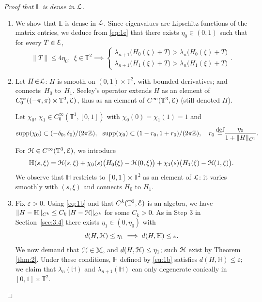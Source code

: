 \documentclass[11pt]{article}
\newcommand{\skpt}{\smallskip}
\numberwithin{equation}{section}
\let\pazocal\EuScript
\theoremstyle{definition}
\newcommand{\supp}{\mathrm{supp}}
\newcommand{\EE}{\pazocal{E}}
\newcommand{\LL}{{\pazocal{L}}}
\newcommand{\HH}{\pazocal{H}}
\newcommand{\Hh}{{\mathbb{H}}}
\newcommand{\Ll}{\mathbb{L}}
\newcommand{\Mm}{\mathbb{M}}
\newcommand{\Z}{\mathbb{Z}}
\newcommand{\Tt}{{\mathbb{T}}}
\let\epsi\varepsilon
\newcommand{\systeme}[1]{\left\{ \begin{matrix} #1 \end{matrix}\right.}
\newcommand{\de}{\,\mathrel{\stackrel{\makebox[0pt]{\mbox{\normalfont\tiny def}}}{=}}}
\begin{document}
\skpt
\begin{proof}[Proof that $\Ll$ is dense in $\LL$]
\begin{enumerate}
\item
We show that $\Ll$ is dense in $\LL$.
Since eigenvalues are Lipschitz functions of the matrix entries, we deduce from \eqref{eq:1e} that there exists $\eta_0 \in (0,1)$ such that for every $T \in \EE$,
\begin{equation}\label{eq:2a}
\| T \| \leq 4\eta_0, \ \ \xi \in \Tt^2 \implies \systeme{
\lambda_{n+1}\bigl(H_0(\xi)+T\bigr) > \lambda_n\bigl(H_0(\xi)+T\bigr)
\\[5pt]
\lambda_{n+1}\bigl(H_1(\xi)+T\bigr) > \lambda_n\bigl(H_1(\xi)+T\bigr)}.
\end{equation}

\item
Let $H\!\in\!\LL$: $H$ is smooth on $(0,1)\!\times\!\Tt^2$, with bounded derivatives; and connects~$H_0$ to~$H_1$. Seeley's operator \cite{S65} extends $H$ as an element of \hbox{$C_0^\infty((-\pi,\pi) \times \Tt^2,\EE)$}, thus as an element of $C^\infty(\Tt^3,\EE)$ (still denoted $H$).

Let $\chi_0$, $\chi_1 \in C_0^\infty(\Tt^1,[0,1])$ with $\chi_0(0) = \chi_1(1) = 1$ and
\begin{equation*}
\supp(\chi_0) \subset (-\delta_0,\delta_0)/(2\pi \Z), \ \ \supp(\chi_0) \subset (1-r_0,1+r_0)/(2\pi \Z), \quad r_0 \de \dfrac{\eta_0}{1+\| H \|_{C^1}}.
\end{equation*}
For $\HH \in C^\infty(\Tt^3,\EE)$, we introduce
\begin{equation}\label{eq:1b}
\Hh(s,\xi) = \HH(s,\xi) + \chi_0(s) \bigl( H_0(\xi) - \HH(0,\xi) \bigr) + \chi_1(s) \bigl( H_1(\xi) - \HH(1,\xi) \bigr).
\end{equation}
We observe that $\Hh$ restricts to $[0,1] \times \Tt^2$ as an element of $\LL$: it varies smoothly with $(s,\xi)$ and connects $H_0$ to $H_1$.

\item
Fix $\epsi > 0$. Using \eqref{eq:1b} and that $C^k(\Tt^3,\EE)$ is an algebra, we have $\| H -\Hh \|_{C^k} \leq C_k \| H -\HH \|_{C^k}$ for some $C_k > 0$. As in Step 3 in Section~\ref{sec:3.4} there exists $\eta_1 \in (0,\eta_0)$ with
\begin{equation*}
d(H,\HH) \leq \eta_1 \implies d(H,\Hh) \leq \epsi.
\end{equation*}
We now demand that $\HH \in \Mm$, and $d(H,\HH) \leq \eta_1$; such $\HH$ exist by Theorem \ref{thm:2}. Under these conditions, $\Hh$ defined by \eqref{eq:1b} satisfies $d(H,\Hh) \leq \epsi$; we claim that $\lambda_n(\Hh)$ and $\lambda_{n+1}(\Hh)$ can only degenerate conically in $[0,1] \times \Tt^2$.


\end{enumerate}
\end{proof}
\end{document}
